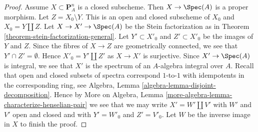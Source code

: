 \begin{proof}
\medskip\noindent
Assume $X \subset \mathbf{P}^n_A$ is a closed subscheme.
Then $X \to \Spec(A)$ is a proper morphism.
Let $Z = X_0 \setminus Y$. This is an open and closed
subscheme of $X_0$ and $X_0 = Y \amalg Z$.
Let $X \to X' \to \Spec(A)$ be the Stein factorization as in
Theorem \ref{theorem-stein-factorization-general}.
Let $Y' \subset X'_0$ and $Z' \subset X'_0$ be the images of
$Y$ and $Z$.
Since the fibres of $X \to Z$ are geometrically connected,
we see that $Y' \cap Z' = \emptyset$.
Hence $X'_0 = Y' \amalg Z'$ as $X \to X'$ is surjective.
Since $X' \to \Spec(A)$ is integral, we see that
$X'$ is the spectrum of an $A$-algebra integral over $A$.
Recall that open and closed subsets of spectra correspond
$1$-to-$1$ with idempotents in the corresponding ring, see
Algebra, Lemma \ref{algebra-lemma-disjoint-decomposition}.
Hence by
More on Algebra, Lemma \ref{more-algebra-lemma-characterize-henselian-pair}
we see that we may write $X' = W' \amalg V'$
with $W'$ and $V'$ open and closed and
with $Y' = W'_0$ and $Z' = V'_0$.
Let $W$ be the inverse image in $X$
to finish the proof.
\end{proof}
